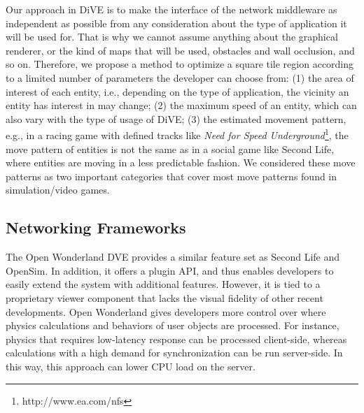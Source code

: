 \documentclass[]{elsarticle}
\begin{document}
Our approach in DiVE is to make the interface of the network middleware as independent as possible from any consideration about the type of application it will be used for. That is why we cannot assume anything about the graphical renderer, or the kind of maps that will be used, obstacles and wall occlusion, and so on. Therefore, we propose a method to optimize a square tile region according to a limited number of parameters the developer can choose from: (1) the area of interest of each entity, i.e., depending on the type of application, the vicinity an entity has interest in may change; (2) the maximum speed of an entity, which can also vary with the type of usage of DiVE; (3) the estimated movement pattern, e.g., in a racing game with defined tracks like \emph{Need for Speed Underground}\footnote{http://www.ea.com/nfs}, the move pattern of entities is not the same as in a social game like Second Life, where entities are moving in a less predictable fashion. We considered these move patterns as two important categories that cover most move patterns found in simulation/video games.


\subsection{Networking Frameworks}

The Open Wonderland \cite{Kaplan+Yankelovich.2011} DVE provides a similar feature set as Second Life and OpenSim. In addition, it offers a plugin API, and thus enables developers to easily extend the system with additional features. However, it is tied to a proprietary viewer component that lacks the visual fidelity of other recent developments. Open Wonderland gives developers more control over where physics calculations and behaviors of user objects are processed. For instance, physics that requires low-latency response can be processed client-side, whereas calculations with a high demand for synchronization can be run server-side. In this way, this approach can lower CPU load on the server.
\end{document}
